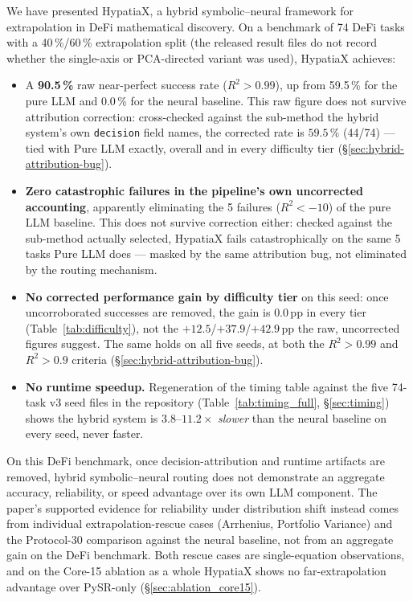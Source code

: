 \documentclass[twoside,11pt]{article}
\newcommand{\Rsq}{R^{2}}
\begin{document}
We have presented HypatiaX, a hybrid symbolic--neural framework for extrapolation
in DeFi mathematical discovery.  On a benchmark of 74 DeFi tasks with a 40\,\%/60\,\% extrapolation split (the released result files do not record whether the single-axis or PCA-directed variant was used), HypatiaX achieves:

\begin{itemize}
  \item A \textbf{90.5\,\%} raw near-perfect success rate ($\Rsq > 0.99$), up from
    59.5\,\% for the pure LLM and 0.0\,\% for the neural baseline. This raw
    figure does not survive attribution correction: cross-checked against the
    sub-method the hybrid system's own \texttt{decision} field names, the
    corrected rate is $59.5\,\%$ (44/74) --- tied with Pure LLM exactly,
    overall and in every difficulty tier (\S\ref{sec:hybrid-attribution-bug}).
  \item \textbf{Zero catastrophic failures in the pipeline's own uncorrected
    accounting}, apparently eliminating the 5 failures ($\Rsq < -10$) of the
    pure LLM baseline. This does not survive correction either: checked
    against the sub-method actually selected, HypatiaX fails catastrophically
    on the same 5 tasks Pure LLM does --- masked by the same attribution bug,
    not eliminated by the routing mechanism.
  \item \textbf{No corrected performance gain by difficulty tier} on this
    seed: once uncorroborated successes are removed, the gain is $0.0$\,pp in
    every tier (Table~\ref{tab:difficulty}), not the $+12.5$/$+37.9$/$+42.9$\,pp
    the raw, uncorrected figures suggest. The same holds on all five seeds, at both the $\Rsq>0.99$ and
    $\Rsq>0.9$ criteria (\S\ref{sec:hybrid-attribution-bug}).
  \item \textbf{No runtime speedup.} Regeneration of the timing table against the five 74-task v3 seed files in the
    repository (Table~\ref{tab:timing_full}, \S\ref{sec:timing}) shows the hybrid
    system is $3.8$--$11.2\times$ \emph{slower} than the neural baseline on
    every seed, never faster.
\end{itemize}

On this DeFi benchmark, once decision-attribution and runtime artifacts are
removed, hybrid symbolic--neural routing does not demonstrate an aggregate
accuracy, reliability, or speed advantage over its own LLM component. The
paper's supported evidence for reliability under distribution shift instead
comes from individual extrapolation-rescue cases (Arrhenius, Portfolio
Variance) and the Protocol-30 comparison against the neural baseline, not
from an aggregate gain on the DeFi benchmark. Both rescue cases are single-equation observations,
and on the Core-15 ablation as a whole HypatiaX shows no far-extrapolation advantage over PySR-only
(\S\ref{sec:ablation_core15}).
\end{document}
